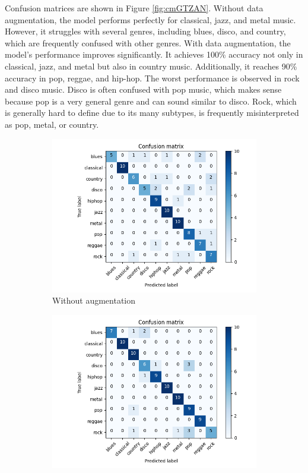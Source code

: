 Confusion matrices are shown in Figure \ref{fig:cmGTZAN}. Without data augmentation, the model performs perfectly for classical, jazz, and metal music. However, it struggles with several genres, including blues, disco, and country, which are frequently confused with other genres. With data augmentation, the model's performance improves significantly. It achieves 100\% accuracy not only in classical, jazz, and metal but also in country music. Additionally, it reaches 90\% accuracy in pop, reggae, and hip-hop. The worst performance is observed in rock and disco music. Disco is often confused with pop music, which makes sense because pop is a very general genre and can sound similar to disco. Rock, which is generally hard to define due to its many subtypes, is frequently misinterpreted as pop, metal, or country.

\begin{figure}[h!]
    \centering
    \begin{subfigure}[b]{0.6\textwidth}
        \centering
        \includegraphics[width=\textwidth]{Images/gtzan_plots/cm/cm_gtzan_no_aug.png}
        \caption{Without augmentation}
    \end{subfigure}
    \begin{subfigure}[b]{0.6\textwidth}
        \centering
        \includegraphics[width=\textwidth]{Images/gtzan_plots/cm/cm_gtzan_aug.png}

\end{subfigure}
\end{figure}
